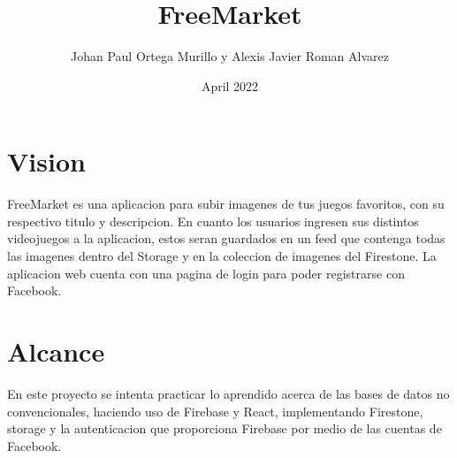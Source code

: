 \documentclass{article}
\title{FreeMarket}
\author{Johan Paul Ortega Murillo y Alexis Javier Roman Alvarez}
\date{April 2022}
\begin{document}
\maketitle

\section{Vision}
FreeMarket es una aplicacion para subir imagenes de tus juegos favoritos, con su respectivo titulo y descripcion. En cuanto los usuarios ingresen sus distintos videojuegos a la aplicacion, estos seran guardados en un feed que contenga todas las imagenes dentro del Storage y en la coleccion de imagenes del Firestone. La aplicacion web cuenta con una pagina de login para poder registrarse con Facebook.


\section{Alcance }
En este proyecto se intenta practicar lo aprendido acerca de las bases de datos no convencionales, haciendo uso de Firebase y React, implementando Firestone, storage y la autenticacion que proporciona Firebase por medio de las cuentas de Facebook.
\end{document}
